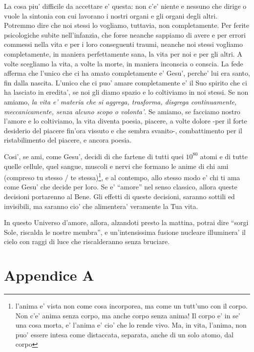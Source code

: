 La cosa piu' difficile da accettare e' questa: non c'e' niente e nessuno che dirige o vuole la sintonia con cui lavorano i nostri organi e gli organi degli altri. Potremmo dire che noi stessi lo vogliamo, tuttavia, non completamente. Per ferite psicologiche subite nell'infanzia, che forse neanche sappiamo di avere e per errori commessi nella vita e per i loro conseguenti traumi, neanche noi stessi vogliamo completamente, in maniera perfettamente sana, la vita per noi e per gli altri. A volte scegliamo la vita, a volte la morte, in maniera inconscia o conscia. La fede afferma che l'unico che ci ha amato completamente e' Gesu', perche' lui era santo, fin dalla nascita. L'unico che ci puo' amare completamente e' il Suo spirito che ci ha lasciato in eredita', se noi gli diamo spazio e lo coltiviamo in noi stessi. Se non amiamo, \emph{la vita e' materia che si aggrega, trasforma, disgrega continuamente, meccanicamente, senza alcuno scopo o volonta'}. Se amiamo, se facciamo nostro l'amore e lo coltiviamo, la vita diventa poesia, piacere, a volte dolore -per il forte desiderio del piacere fin'ora vissuto e che sembra svanito-, combattimento per il ristabilimento del piacere, e ancora poesia. 

Cosi', se ami, come Gesu', decidi di che fartene di tutti quei $10^{80}$ atomi e di tutte quelle cellule, quel sangue, muscoli e nervi che formano le anime di chi ami (compreso tu stesso / te stessa)\footnote{l'anima e' vista non come cosa incorporea, ma come un tutt'uno con il corpo. Non c'e' anima senza corpo, ma anche corpo senza anima! Il corpo e' in se' una cosa morta, e' l'anima e' cio' che lo rende vivo. Ma, in vita, l'anima, non puo' essere intesa come distaccata, separata, anche di un solo atomo, dal corpo}, e al contempo, allo stesso modo e' chi ti ama come Gesu' che decide per loro. Se e' ``amore'' nel senso classico, allora queste decisioni portarenno al Bene. Gli effetti di queste decisioni, saranno sottili ed invisibili, ma saranno cio' che alimentera' veramente la Tua vita.

In questo Universo d'amore, allora, alzandoti presto la mattina, potrai dire ``sorgi Sole, riscalda le nostre membra'', e un'intensissima fusione nucleare illuminera' il cielo con raggi di luce che riscalderanno senza bruciare.



\section{Appendice A}
\label{menteCrea}

